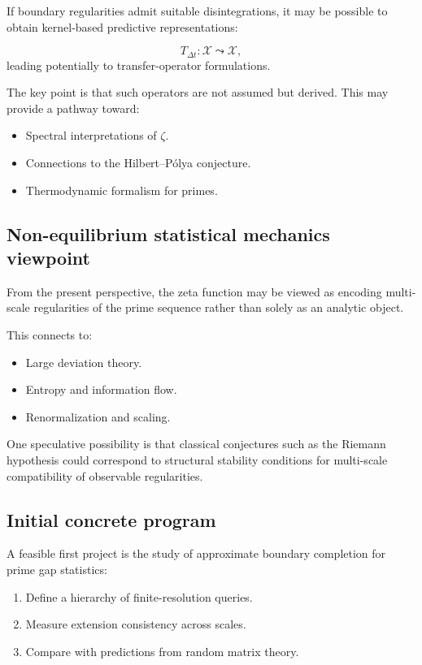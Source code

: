 \documentclass[11pt]{article}
\begin{document}
If boundary regularities admit suitable disintegrations, it may be
possible to obtain kernel-based predictive representations:

\[
T_{\Delta t} : \mathcal{X} \leadsto \mathcal{X},
\]
leading potentially to transfer-operator formulations.

The key point is that such operators are not assumed but derived. This may
provide a pathway toward:
\begin{itemize}
  \item Spectral interpretations of $\zeta$.
  \item Connections to the Hilbert--Pólya conjecture.
  \item Thermodynamic formalism for primes.
\end{itemize}

\subsection{Non-equilibrium statistical mechanics viewpoint}

From the present perspective, the zeta function may be viewed as encoding
multi-scale regularities of the prime sequence rather than solely as an
analytic object.

This connects to:
\begin{itemize}
  \item Large deviation theory.
  \item Entropy and information flow.
  \item Renormalization and scaling.
\end{itemize}

One speculative possibility is that classical conjectures such as the
Riemann hypothesis could correspond to structural stability conditions
for multi-scale compatibility of observable regularities.

\subsection{Initial concrete program}

A feasible first project is the study of approximate boundary completion for
prime gap statistics:
\begin{enumerate}
  \item Define a hierarchy of finite-resolution queries.
  \item Measure extension consistency across scales.
  \item Compare with predictions from random matrix theory.
\end{enumerate}
\end{document}
